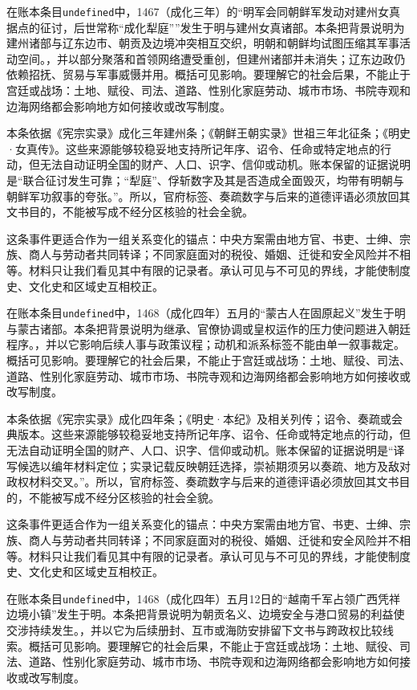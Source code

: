 在账本条目\texttt{undefined}中，1467（成化三年）的“明军会同朝鲜军发动对建州女真据点的征讨，后世常称“成化犁庭””发生于明与建州女真诸部。本条把背景说明为建州诸部与辽东边市、朝贡及边境冲突相互交织，明朝和朝鲜均试图压缩其军事活动空间。，并以部分聚落和首领网络遭受重创，但建州诸部并未消失；辽东边政仍依赖招抚、贸易与军事威慑并用。概括可见影响。要理解它的社会后果，不能止于宫廷或战场：土地、赋役、司法、道路、性别化家庭劳动、城市市场、书院寺观和边海网络都会影响地方如何接收或改写制度。

本条依据《宪宗实录》成化三年建州条；《朝鲜王朝实录》世祖三年北征条；《明史·女真传》。这些来源能够较稳妥地支持所记年序、诏令、任命或特定地点的行动，但无法自动证明全国的财产、人口、识字、信仰或动机。账本保留的证据说明是“联合征讨发生可靠；“犁庭”、俘斩数字及其是否造成全面毁灭，均带有明朝与朝鲜军功叙事的夸张。”。所以，官府标签、奏疏数字与后来的道德评语必须放回其文书目的，不能被写成不经分区核验的社会全貌。

这条事件更适合作为一组关系变化的锚点：中央方案需由地方官、书吏、士绅、宗族、商人与劳动者共同转译；不同家庭面对的税役、婚姻、迁徙和安全风险并不相等。材料只让我们看见其中有限的记录者。承认可见与不可见的界线，才能使制度史、文化史和区域史互相校正。

在账本条目\texttt{undefined}中，1468（成化四年）五月的“蒙古人在固原起义”发生于明与蒙古诸部。本条把背景说明为继承、官僚协调或皇权运作的压力使问题进入朝廷程序。，并以它影响后续人事与政策议程；动机和派系标签不能由单一叙事裁定。概括可见影响。要理解它的社会后果，不能止于宫廷或战场：土地、赋役、司法、道路、性别化家庭劳动、城市市场、书院寺观和边海网络都会影响地方如何接收或改写制度。

本条依据《宪宗实录》成化四年条；《明史·本纪》及相关列传；诏令、奏疏或会典版本。这些来源能够较稳妥地支持所记年序、诏令、任命或特定地点的行动，但无法自动证明全国的财产、人口、识字、信仰或动机。账本保留的证据说明是“译写候选以编年材料定位；实录记载反映朝廷选择，崇祯期须另以奏疏、地方及敌对政权材料交叉。”。所以，官府标签、奏疏数字与后来的道德评语必须放回其文书目的，不能被写成不经分区核验的社会全貌。

这条事件更适合作为一组关系变化的锚点：中央方案需由地方官、书吏、士绅、宗族、商人与劳动者共同转译；不同家庭面对的税役、婚姻、迁徙和安全风险并不相等。材料只让我们看见其中有限的记录者。承认可见与不可见的界线，才能使制度史、文化史和区域史互相校正。

在账本条目\texttt{undefined}中，1468（成化四年）五月12日的“越南千军占领广西凭祥边境小镇”发生于明。本条把背景说明为朝贡名义、边境安全与港口贸易的利益使交涉持续发生。，并以它为后续册封、互市或海防安排留下文书与跨政权比较线索。概括可见影响。要理解它的社会后果，不能止于宫廷或战场：土地、赋役、司法、道路、性别化家庭劳动、城市市场、书院寺观和边海网络都会影响地方如何接收或改写制度。

